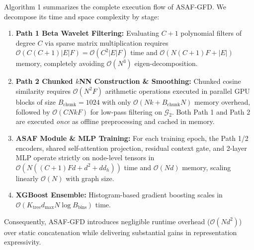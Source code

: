 \documentclass[10pt,a4paper,twocolumn]{article}
\begin{document}
Algorithm 1 summarizes the complete execution flow of ASAF-GFD. We decompose its time and space complexity by stage:
\begin{enumerate}
  \item \textbf{Path 1 Beta Wavelet Filtering:} Evaluating $C+1$ polynomial filters of degree $C$ via sparse matrix multiplication requires $\mathscr{O}(C(C+1)|E|F) = \mathscr{O}(C^2|E|F)$ time and $\mathscr{O}(N(C+1)F + |E|)$ memory, completely avoiding $\mathscr{O}(N^3)$ eigen-decomposition.
  \item \textbf{Path 2 Chunked $k$NN Construction \& Smoothing:} Chunked cosine similarity requires $\mathscr{O}(N^2 F)$ arithmetic operations executed in parallel GPU blocks of size $B_{\text{chunk}} = 1024$ with only $\mathscr{O}(Nk + B_{\text{chunk}}N)$ memory overhead, followed by $\mathscr{O}(CNkF)$ for low-pass filtering on $\mathscr{G}_2$. Both Path 1 and Path 2 are executed \textit{once} as offline preprocessing and cached in memory.
  \item \textbf{ASAF Module \& MLP Training:} For each training epoch, the Path 1/2 encoders, shared self-attention projection, residual context gate, and 2-layer MLP operate strictly on node-level tensors in $\mathscr{O}(N((C+1)Fd + d^2 + dd_h))$ time and $\mathscr{O}(Nd)$ memory, scaling linearly $\mathscr{O}(N)$ with graph size.
  \item \textbf{XGBoost Ensemble:} Histogram-based gradient boosting scales in $\mathscr{O}(K_{\text{tree}} d_{\max} N \log B_{\text{bins}})$ time.
\end{enumerate}

Consequently, ASAF-GFD introduces negligible runtime overhead ($\mathscr{O}(Nd^2)$) over static concatenation while delivering substantial gains in representation expressivity.

\begin{table}[!h]
  \centering
  \caption{Statistical information of the four real-world financial fraud benchmark datasets evaluated in our experiments.}
  \label{tab:datasets}
\end{table}
\end{document}
